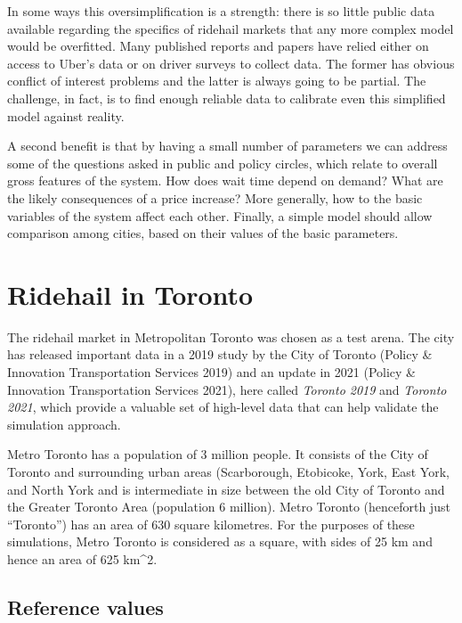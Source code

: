 \documentclass[
  letterpaper,
  DIV=11,
  numbers=noendperiod]{scrartcl}
\begin{document}
In some ways this oversimplification is a strength: there is so little
public data available regarding the specifics of ridehail markets that
any more complex model would be overfitted. Many published reports and
papers have relied either on access to Uber's data or on driver surveys
to collect data. The former has obvious conflict of interest problems
and the latter is always going to be partial. The challenge, in fact, is
to find enough reliable data to calibrate even this simplified model
against reality.

A second benefit is that by having a small number of parameters we can
address some of the questions asked in public and policy circles, which
relate to overall gross features of the system. How does wait time
depend on demand? What are the likely consequences of a price increase?
More generally, how to the basic variables of the system affect each
other. Finally, a simple model should allow comparison among cities,
based on their values of the basic parameters.

\hypertarget{simulating-ridehail-in-toronto}{%
\section{Ridehail in Toronto}\label{simulating-ridehail-in-toronto}}

The ridehail market in Metropolitan Toronto was chosen as a test arena.
The city has released important data in a 2019 study by the City of
Toronto (Policy \& Innovation Transportation Services 2019) and an
update in 2021 (Policy \& Innovation Transportation Services 2021), here
called \emph{Toronto 2019} and \emph{Toronto 2021}, which provide a
valuable set of high-level data that can help validate the simulation
approach.

Metro Toronto has a population of 3 million people. It consists of the
City of Toronto and surrounding urban areas (Scarborough, Etobicoke,
York, East York, and North York and is intermediate in size between the
old City of Toronto and the Greater Toronto Area (population 6 million).
Metro Toronto (henceforth just ``Toronto'') has an area of 630 square
kilometres. For the purposes of these simulations, Metro Toronto is
considered as a square, with sides of 25 km and hence an area of 625
km\^{}2.

\hypertarget{reference-values}{%
\subsection{Reference values}\label{reference-values}}
\end{document}
